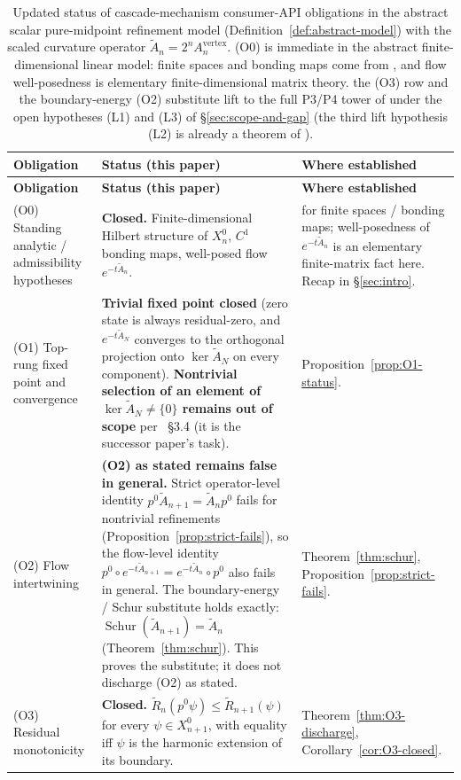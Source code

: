 \documentclass[11pt]{article}
\theoremstyle{plain}
\theoremstyle{definition}
\theoremstyle{remark}
\newcommand{\Schur}{\operatorname{Schur}}
\begin{document}
\begin{longtable}{>{\raggedright\arraybackslash}p{}>{\raggedright\arraybackslash}p{}>{\raggedright\arraybackslash}p{}}
\caption{Updated status of cascade-mechanism consumer-API obligations
in the abstract scalar pure-midpoint refinement model
(Definition~\ref{def:abstract-model}) with the scaled curvature
operator $\widetilde A_n = 2^n A_n^{\mathrm{vertex}}$. (O0) is
immediate in the abstract finite-dimensional linear model: finite
spaces and bonding maps come from \cite{CascadeRefinementSpaces},
and flow well-posedness is elementary finite-dimensional matrix
theory. the (O3) row and the boundary-energy
(O2) substitute lift to the full P3/P4 tower of
\cite{CascadeRefinementSpaces, CascadeClosureDynamics} under the
open hypotheses \textup{(L1)} and \textup{(L3)} of
\S\ref{sec:scope-and-gap} (the third lift hypothesis \textup{(L2)}
is already a theorem of \cite{CascadeRefinementSpaces}).}\label{tab:status-update}\\
\toprule
\textbf{Obligation} & \textbf{Status (this paper)} & \textbf{Where established} \\
\midrule
\endfirsthead
\toprule
\textbf{Obligation} & \textbf{Status (this paper)} & \textbf{Where established} \\
\midrule
\endhead
(O0) Standing analytic / admissibility hypotheses
& \textbf{Closed.} Finite-dimensional Hilbert structure of $X_n^{0}$, $C^1$ bonding maps, well-posed flow $e^{-t \widetilde A_n}$.
& \cite{CascadeRefinementSpaces} for finite spaces / bonding maps; well-posedness of $e^{-t \widetilde A_n}$ is an elementary finite-matrix fact here. Recap in \S\ref{sec:intro}. \\
(O1) Top-rung fixed point and convergence
& \textbf{Trivial fixed point closed} (zero state is always residual-zero, and $e^{-t \widetilde A_N}$ converges to the orthogonal projection onto $\ker \widetilde A_N$ on every component). \textbf{Nontrivial selection of an element of $\ker \widetilde A_N \ne \{0\}$ remains out of scope} per \cite{CascadeMechanism}~\S3.4 (it is the successor paper's task).
& Proposition~\ref{prop:O1-status}. \\
(O2) Flow intertwining
& \textbf{(O2) as stated remains false in general.} Strict operator-level identity $p^{0} \widetilde A_{n+1} = \widetilde A_n p^{0}$ fails for nontrivial refinements (Proposition~\ref{prop:strict-fails}), so the flow-level identity $p^{0} \circ e^{-t \widetilde A_{n+1}} = e^{-t \widetilde A_n} \circ p^{0}$ also fails in general. The boundary-energy / Schur substitute holds exactly: $\Schur(\widetilde A_{n+1}) = \widetilde A_n$ (Theorem~\ref{thm:schur}). This proves the substitute; it does not discharge (O2) as stated.
& Theorem~\ref{thm:schur}, Proposition~\ref{prop:strict-fails}. \\
(O3) Residual monotonicity
& \textbf{Closed.} $\widetilde R_n(p^{0} \psi) \le \widetilde R_{n+1}(\psi)$ for every $\psi \in X_{n+1}^{0}$, with equality iff $\psi$ is the harmonic extension of its boundary.
& Theorem~\ref{thm:O3-discharge}, Corollary~\ref{cor:O3-closed}. \\
\bottomrule
\end{longtable}
\end{document}

